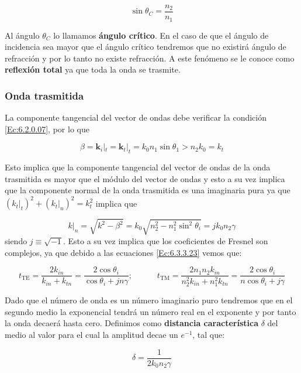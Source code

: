 \documentclass[12pt,a4paper]{article}
\newcommand{\tquad}{\quad \quad \quad}
\newcommand{\TE}{\mathrm{TE}}
\newcommand{\TM}{\mathrm{TM}}
\newcommand{\kn}{\mathbf{k}}
\numberwithin{equation}{section}
\numberwithin{figure}{section}
\begin{document}
\begin{equation}
\sin \theta_C = \dfrac{n_2}{n_1}
\end{equation}

Al ángulo $\theta_C$ lo llamamos \textbf{ángulo crítico}. En el caso de que el ángulo de incidencia sea mayor que el ángulo crítico tendremos que no existirá ángulo de refracción y por lo tanto no existe refracción. A este fenómeno se le conoce como \textbf{reflexión total} ya que toda la onda se trasmite. 


\subsubsection{Onda trasmitida}

La componente tangencial del vector de ondas debe verificar la condición \ref{Ec:6.2.0.07}, por lo que

\begin{equation}
\beta = \kn_i |_t = \kn_t |_t = k_0 n_1 \sin \theta_1 > n_2 k_0 = k_t
\end{equation}

Esto implica que la componente tangencial del vector de ondas de la onda trasmitida es mayor que el módulo del vector de ondas y esto a su vez implica que la componente normal de la onda trasmitida es una imaginaria pura ya que
$(k_t |_t)^2 + (k_t |_n)^2 = k_t^2$ implica que

\begin{equation}
k |_n = \sqrt{k^2 - \beta^2} = k_0 \sqrt{n_2^2 - n_1^2 \sin^2 \theta_i} = j k_0 n_2 \gamma
\end{equation}
siendo $j \equiv \sqrt{-1}$. Esto a su vez implica que los coeficientes de Fresnel son complejos, ya que debido a las ecuaciones \ref{Ec:6.3.3.23} vemos que:

\begin{equation}
t_{\TE} = \dfrac{2 k_{in}}{k_{in}+k_{tn}} = \dfrac{2 \cos \theta_i}{\cos \theta_i + j n \gamma}; \tquad t_{\TM} = \dfrac{2 n_1 n_2 k_{in}}{n_2^2 k_{in}+n_1^2 k_{tn}} = \dfrac{2 \cos \theta_i}{n \cos \theta_i + j \gamma}
\end{equation}

Dado que el número de onda es un número imaginario puro tendremos que en el segundo medio la exponencial tendrá un número real en el exponente y por tanto la onda decaerá hasta cero. Definimos como \textbf{distancia característica} $\delta$ del medio al valor para el cual la amplitud decae un $e^{-1}$, tal que:

\begin{equation}
\delta = \dfrac{1}{2 k_0 n_2 \gamma}
\end{equation}
\end{document}
